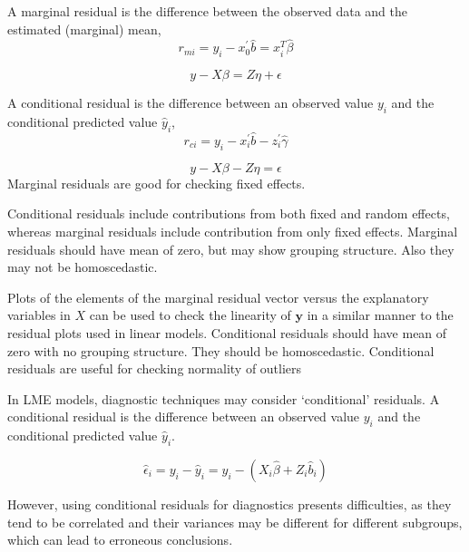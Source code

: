 \documentclass[12pt, a4paper]{report}
\theoremstyle{plain}
\theoremstyle{definition}
\theoremstyle{remark}
\begin{document}
	
	
	
	
	
	
	
	
	
	A marginal residual is the difference between the observed data and the estimated (marginal) mean, 
	\[r_{mi} = y_i - x_0^{\prime} \hat{b} =x^{T}_{i}\hat{\beta}\]
	
	\[y - X\beta = Z \eta +\epsilon \]
	
A conditional residual is the difference between an observed value $y_{i}$ and the conditional predicted value $\hat{y}_{i} $,
	\[r_{ci} = y_i - x_i^{\prime} \hat{b} - z_i^{\prime} \hat{\gamma}\]
	
	\[y - X\beta - Z \eta = \epsilon \]
	 Marginal residuals are good for checking fixed effects.	
	 
Conditional residuals include contributions from both fixed and random effects, whereas marginal residuals include contribution from only fixed effects. Marginal residuals should have mean of zero, but may show grouping structure. Also they may not be homoscedastic.
	
Plots of the elements of the marginal residual vector versus the explanatory variables in $X$ can be used to check the linearity of $\boldsymbol{y}$ in a similar manner to the residual plots used in linear models.	Conditional residuals should have mean of zero with no grouping structure. They should be homoscedastic. Conditional residuals are useful for checking normality of outliers
	
	
In LME models, diagnostic techniques may consider `conditional' residuals. A conditional residual is the difference between an observed value $y_{i}$ and the conditional predicted value $\hat{y}_{i} $.
	
	\[ \hat{\epsilon}_{i} = y_{i} - \hat{y}_{i} = y_{i} - ( X_{i}\hat{\beta} + Z_{i}\hat{b}_{i}) \]
	
	However, using conditional residuals for diagnostics presents difficulties, as they tend to be correlated and their variances may be different for different subgroups, which can lead to erroneous conclusions.
	
\end{document}
